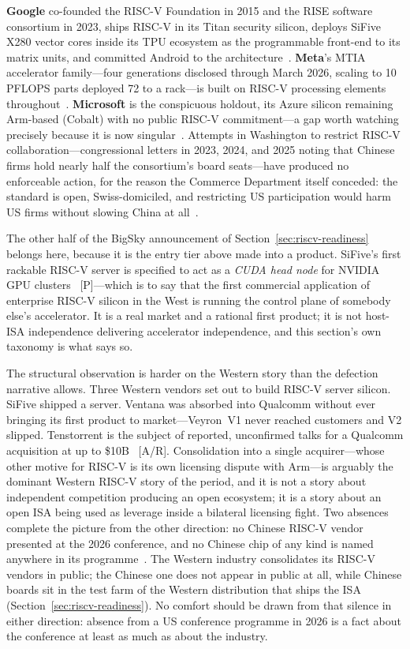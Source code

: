 \textbf{Google} co-founded the RISC-V Foundation in 2015 and the RISE software consortium in 2023, ships RISC-V in its Titan security silicon, deploys SiFive X280 vector cores inside its TPU ecosystem as the programmable front-end to its matrix units, and committed Android to the architecture~\cite{google-riscv}. \textbf{Meta}'s MTIA accelerator family---four generations disclosed through March 2026, scaling to 10\,PFLOPS parts deployed 72 to a rack---is built on RISC-V processing elements throughout~\cite{mtia}. \textbf{Microsoft} is the conspicuous holdout, its Azure silicon remaining Arm-based (Cobalt) with no public RISC-V commitment---a gap worth watching precisely because it is now singular~\cite{cobalt}. Attempts in Washington to restrict RISC-V collaboration---congressional letters in 2023, 2024, and 2025 noting that Chinese firms hold nearly half the consortium's board seats---have produced no enforceable action, for the reason the Commerce Department itself conceded: the standard is open, Swiss-domiciled, and restricting US participation would harm US firms without slowing China at all~\cite{riscv-restrict}.

The other half of the BigSky announcement of Section~\ref{sec:riscv-readiness} belongs here, because it is the entry tier above made into a product. SiFive's first rackable RISC-V server is specified to act as a \emph{CUDA head node} for NVIDIA GPU clusters~\cite{sifive-bigsky} [P]---which is to say that the first commercial application of enterprise RISC-V silicon in the West is running the control plane of somebody else's accelerator. It is a real market and a rational first product; it is not host-ISA independence delivering accelerator independence, and this section's own taxonomy is what says so.

The structural observation is harder on the Western story than the defection narrative allows. Three Western vendors set out to build RISC-V server silicon. SiFive shipped a server. Ventana was absorbed into Qualcomm without ever bringing its first product to market---Veyron~V1 never reached customers and V2 slipped. Tenstorrent is the subject of reported, unconfirmed talks for a Qualcomm acquisition at up to \$10B~\cite{riscv-consolidation} [A/R]. Consolidation into a single acquirer---whose other motive for RISC-V is its own licensing dispute with Arm---is arguably the dominant Western RISC-V story of the period, and it is not a story about independent competition producing an open ecosystem; it is a story about an open ISA being used as leverage inside a bilateral licensing fight. Two absences complete the picture from the other direction: no Chinese RISC-V vendor presented at the 2026 conference, and no Chinese chip of any kind is named anywhere in its programme~\cite{hc2026}. The Western industry consolidates its RISC-V vendors in public; the Chinese one does not appear in public at all, while Chinese boards sit in the test farm of the Western distribution that ships the ISA (Section~\ref{sec:riscv-readiness}). No comfort should be drawn from that silence in either direction: absence from a US conference programme in 2026 is a fact about the conference at least as much as about the industry.

